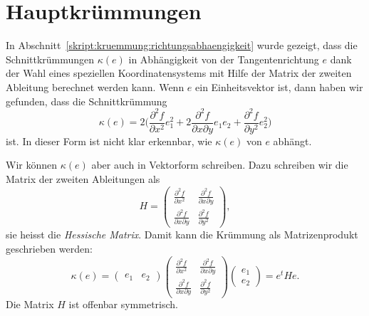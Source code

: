 %
%
%
\section{Hauptkrümmungen}
In Abschnitt~\eqref{skript:kruemmung:richtungsabhaengigkeit} wurde gezeigt,
dass die Schnittkrümmungen $\kappa(e)$ in Abhängigkeit von der
Tangentenrichtung $e$ dank der Wahl eines speziellen Koordinatensystems
mit Hilfe der Matrix der zweiten Ableitung berechnet werden kann.
Wenn $e$ ein Einheitsvektor ist, dann haben wir gefunden, dass die
Schnittkrümmung
\[
\kappa(e)
=
2\biggl(
\frac{\partial^2 f}{\partial x^2}
e_1^2
+
2
\frac{\partial^2 f}{\partial x\partial y}e_1e_2
+
\frac{\partial^2 f}{\partial y^2}e_2^2
\biggr)
\]
ist.
In dieser Form ist nicht klar erkennbar, wie $\kappa(e)$ von $e$ abhängt.

Wir können $\kappa(e)$ aber auch in Vektorform schreiben.
Dazu schreiben wir die Matrix der zweiten Ableitungen als
\[
H
=
\begin{pmatrix}
\displaystyle\frac{\partial^2 f}{\partial x^2}&
\displaystyle\frac{\partial^2 f}{\partial x\partial y}\\
\displaystyle\frac{\partial^2 f}{\partial x\partial y}&
\displaystyle\frac{\partial^2 f}{\partial y^2}
\end{pmatrix},
\]
sie heisst die {\em Hessische Matrix}.
Damit kann die Krümmung als Matrizenprodukt geschrieben werden:
\[
\kappa(e)
=
\begin{pmatrix}e_1&e_2\end{pmatrix}
\begin{pmatrix}
\displaystyle\frac{\partial^2 f}{\partial x^2}&
\displaystyle\frac{\partial^2 f}{\partial x\partial y}\\
\displaystyle\frac{\partial^2 f}{\partial x\partial y}&
\displaystyle\frac{\partial^2 f}{\partial y^2}
\end{pmatrix}
\begin{pmatrix}e_1\\e_2\end{pmatrix}
=
e^tHe.
\]
Die Matrix $H$ ist offenbar symmetrisch.

